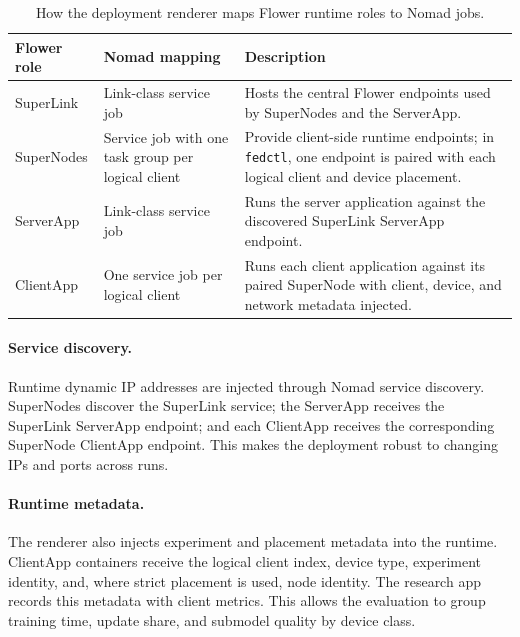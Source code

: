 \begin{table}[!htbp]
\centering
\small
{\renewcommand{\arraystretch}{1.2}
\begin{tabularx}{\textwidth}{@{}>{\raggedright\arraybackslash}p{}>{\raggedright\arraybackslash}p{}>{\raggedright\arraybackslash}X@{}}
\toprule
\textbf{Flower role} & \textbf{Nomad mapping} & \textbf{Description} \\
\midrule
SuperLink & Link-class service job & Hosts the central Flower endpoints used by SuperNodes and the ServerApp. \\
SuperNodes & Service job with one task group per logical client & Provide client-side runtime endpoints; in \texttt{fedctl}, one endpoint is paired with each logical client and device placement. \\
ServerApp & Link-class service job & Runs the server application against the discovered SuperLink ServerApp endpoint. \\
ClientApp & One service job per logical client & Runs each client application against its paired SuperNode with client, device, and network metadata injected. \\
\bottomrule
\end{tabularx}
}
\caption{How the deployment renderer maps Flower runtime roles to Nomad jobs.}
\label{tab:nomad_flower_role_mapping}
\end{table}



\paragraph{Service discovery.}
Runtime dynamic IP addresses are injected through Nomad service discovery. SuperNodes discover the SuperLink service; the ServerApp receives the SuperLink ServerApp endpoint; and each ClientApp receives the corresponding SuperNode ClientApp endpoint. This makes the deployment robust to changing IPs and ports across runs.

\paragraph{Runtime metadata.}
The renderer also injects experiment and placement metadata into the runtime. ClientApp containers receive the logical client index, device type, experiment identity, and, where strict placement is used, node identity. The research app \researchapp{} records this metadata with client metrics. This allows the evaluation to group training time, update share, and submodel quality by device class.

